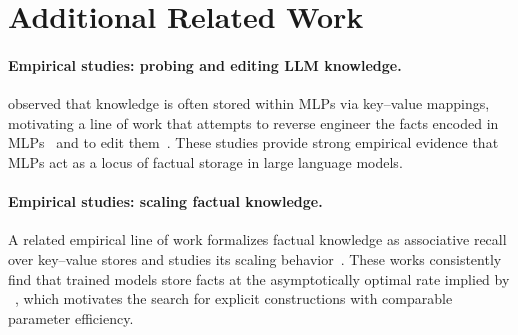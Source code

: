 \section{Additional Related Work}
\label{app:related_work}

\paragraph{Empirical studies: probing and editing LLM knowledge.}
\citet{geva2021transformerfeedforwardlayerskeyvalue,geva2022transformerfeedforwardlayersbuild} observed that knowledge is often stored within MLPs via key--value mappings, motivating a line of work that attempts to reverse engineer the facts encoded in MLPs~\citep{dai2022knowledgeneuronspretrainedtransformers,nanda2023factfinding} and to edit them~\citep{dai2022knowledgeneuronspretrainedtransformers,meng2023locatingeditingfactualassociations,memit,model_edit_scaling,gu2024modeleditingharmsgeneral,fang2025alphaeditnullspaceconstrainedknowledge,sun2025mitigatingnegativeinterferencemultilingual}. These studies provide strong empirical evidence that MLPs act as a locus of factual storage in large language models.

\paragraph{Empirical studies: scaling factual knowledge.}
A related empirical line of work formalizes factual knowledge as associative recall over key--value stores and studies its scaling behavior~\citep{elhage2022toymodelssuperposition,allenzhu2024physicslanguagemodels33,zucchet2025languagemodelslearnfacts}. These works consistently find that trained models store facts at the asymptotically optimal rate implied by ~\citep{allenzhu2024physicslanguagemodels33,zucchet2025languagemodelslearnfacts,morris2025languagemodelsmemorize}, which motivates the search for explicit constructions with comparable parameter efficiency.
